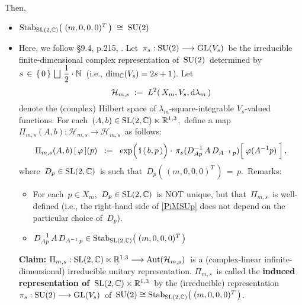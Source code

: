 \vskip 0.5cm
\noindent
Then,
\begin{itemize}
\item
	$\textnormal{Stab}_{\textnormal{SL}(2,\mathbb{C})}\!\left(\;(m,0,0,0)^{T}\,\right) \;\cong\; \textnormal{SU}(2)$
\item
	Here, we follow \S9.4, p.215, \cite{Talagrand2022}.
	Let
	\,$\pi_{s} : \textnormal{SU}(2) \longrightarrow \textnormal{GL}(V_{s})$\,
	be the irreducible finite-dimensional complex representation of \,$\textnormal{SU}(2)$\,
	determined by
	\,$s \,\in\, \{\,0\,\} \,\bigsqcup\, \dfrac{1}{2}\cdot\mathbb{N}$\,
	(i.e., $\dim_{\mathbb{C}}(V_{s}) = 2s + 1$).
	Let
	\begin{equation*}
	\mathcal{H}_{m,s}
	\; := \;
		L^{2}\!\left(\,X_{m},V_{s},\textnormal{d}\lambda_{m}\,\right)
	\end{equation*}
	denote the (complex) Hilbert space of $\lambda_{m}$-square-integrable
	$V_{s}$-valued functions.
	For each
	\,$(A,b) \in \textnormal{SL}(2,\mathbb{C}) \ltimes \mathbb{R}^{1,3}$,\,
	define a map
	\,$\Pi_{m,s}\!\left(A,b\right) : \mathcal{H}_{m,s} \longrightarrow \mathcal{H}_{m,s}$\,
	as follows:
	\begin{equation}\label{PiMSUp}
	\Pi_{m,s}\!\left(A,b\right)[\,\varphi\,](p)
	\;\; := \;\;
		\exp\!\left(\,\overset{{\color{white}.}}{\i}\,\langle\,b,p\,\rangle\right)
		\cdot\,
		\pi_{s}(D^{-1}_{Ap}\,A\,D_{A^{-1}\,p})\!\left[\;
			\overset{{\color{white}.}}{\varphi(A^{-1}p)}
			\;\right],
	\end{equation}
	where
	\,$D_{p} \in \textnormal{SL}(2,\mathbb{C})$\, is such that \,$D_{p}\!\left(\,(m,0,0,0)^{T}\,\right) \,=\, p$.\,
	\vskip 0.1cm
	\noindent
	Remarks:
	\begin{itemize}
	\item
		For each \,$p \in X_{m}$,\, $D_{p} \in \textnormal{SL}(2,\mathbb{C})$\, is NOT unique,
		but that \,$\Pi_{m,s}$\, is well-defined
		(i.e., the right-hand side of \eqref{PiMSUp} does not depend on the particular choice of \,$D_{p}$).\,
	\item
		$D^{-1}_{Ap}\,A\,D_{A^{-1}\,p} \in \textnormal{Stab}_{\textnormal{SL}(2,\mathbb{C})}\!\left(\;(m,0,0,0)^{T}\,\right)$
	\end{itemize}
	\vskip 0.1cm
	\textbf{Claim:}\;
	$\Pi_{m,s} : \textnormal{SL}(2,\mathbb{C}) \ltimes \mathbb{R}^{1,3} \longrightarrow \textnormal{Aut}\!\left(\mathcal{H}_{m,s}\right)$\,
	is a (complex-linear infinite-dimensional) irreducible unitary representation.
	\vskip 0.1cm
	$\Pi_{m,s}$\, is called the \textbf{induced representation of \,$\textnormal{SL}(2,\mathbb{C}) \times \mathbb{R}^{1,3}$}\,
	by the (irreducible) representation
	\,$\pi_{s} : \textnormal{SU}(2) \longrightarrow \textnormal{GL}(V_{s})$\,
	of
	\,$\textnormal{SU}(2) \cong \textnormal{Stab}_{\textnormal{SL}(2,\mathbb{C})}\!\left(\;(m,0,0,0)^{T}\,\right)$.\,
\end{itemize}



